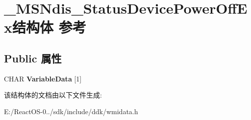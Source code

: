 \hypertarget{struct___m_s_ndis___status_device_power_off_ex}{}\section{\+\_\+\+M\+S\+Ndis\+\_\+\+Status\+Device\+Power\+Off\+Ex结构体 参考}
\label{struct___m_s_ndis___status_device_power_off_ex}
\subsection*{Public 属性}
\begin{DoxyCompactItemize}
\item 
\mbox{\label{struct___m_s_ndis___status_device_power_off_ex_ac20bad88cd8c31fd7a0504c6b3f42c34}} 
C\+H\+AR {\bfseries Variable\+Data} \mbox{[}1\mbox{]}
\end{DoxyCompactItemize}


该结构体的文档由以下文件生成\+:\begin{DoxyCompactItemize}
\item 
E\+:/\+React\+O\+S-\/0../sdk/include/ddk/wmidata.\+h\end{DoxyCompactItemize}
